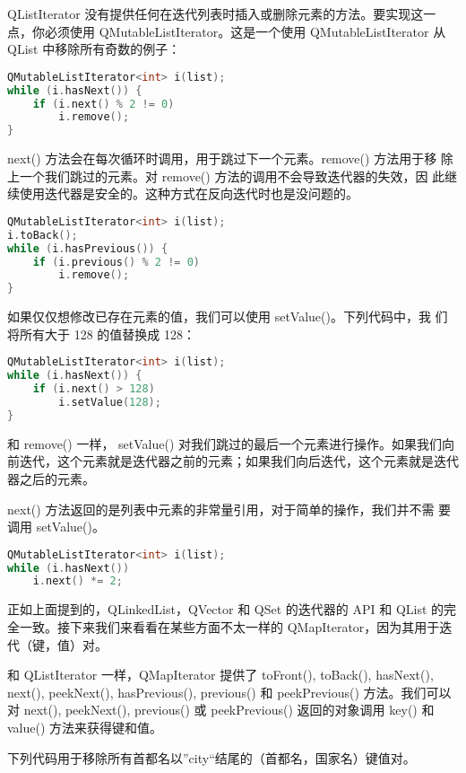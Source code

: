 QListIterator 没有提供任何在迭代列表时插入或删除元素的方法。要实现这一
点，你必须使用 QMutableListIterator。这是一个使用 QMutableListIterator
从 QList 中移除所有奇数的例子：

\begin{lstlisting}[language=C++]
QMutableListIterator<int> i(list);
while (i.hasNext()) {
    if (i.next() % 2 != 0)
        i.remove();
}
\end{lstlisting}

next() 方法会在每次循环时调用，用于跳过下一个元素。remove() 方法用于移
除上一个我们跳过的元素。对 remove() 方法的调用不会导致迭代器的失效，因
此继续使用迭代器是安全的。这种方式在反向迭代时也是没问题的。

\begin{lstlisting}[language=C++]
QMutableListIterator<int> i(list);
i.toBack();
while (i.hasPrevious()) {
    if (i.previous() % 2 != 0)
        i.remove();
}
\end{lstlisting}

如果仅仅想修改已存在元素的值，我们可以使用 setValue()。下列代码中，我
们将所有大于 128 的值替换成 128：

\begin{lstlisting}[language=C++]
QMutableListIterator<int> i(list);
while (i.hasNext()) {
    if (i.next() > 128)
        i.setValue(128);
}
\end{lstlisting}

和 remove() 一样， setValue() 对我们跳过的最后一个元素进行操作。如果我们向前迭代，这个元素就是迭代器之前的元素；如果我们向后迭代，这个元素就是迭代器之后的元素。

next() 方法返回的是列表中元素的非常量引用，对于简单的操作，我们并不需
要调用 setValue()。

\begin{lstlisting}[language=C++]
QMutableListIterator<int> i(list);
while (i.hasNext())
    i.next() *= 2;
\end{lstlisting}

正如上面提到的，QLinkedList，QVector 和 QSet 的迭代器的 API 和 QList 的完全一致。接下来我们来看看在某些方面不太一样的 QMapIterator，因为其用于迭代（键，值）对。

和 QListIterator 一样，QMapIterator 提供了 toFront(), toBack(), hasNext(), next(), peekNext(), hasPrevious(), previous() 和 peekPrevious() 方法。我们可以对 next(), peekNext(), previous() 或 peekPrevious() 返回的对象调用 key() 和 value() 方法来获得键和值。

下列代码用于移除所有首都名以”city“结尾的（首都名，国家名）键值对。

